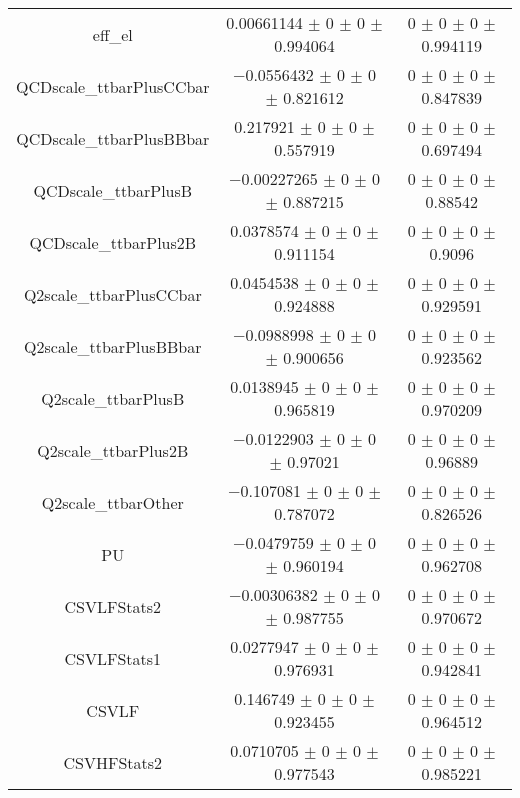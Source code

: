 \begin{table}
\begin{tabular}{ccc}
eff\_el & \num{0.00661144} $\pm$ \num{0} $\pm$ \num{0} $\pm$ \num{0.994064} & \num{0} $\pm$ \num{0} $\pm$ \num{0} $\pm$ \num{0.994119}\\
QCDscale\_ttbarPlusCCbar & \num{-0.0556432} $\pm$ \num{0} $\pm$ \num{0} $\pm$ \num{0.821612} & \num{0} $\pm$ \num{0} $\pm$ \num{0} $\pm$ \num{0.847839}\\
QCDscale\_ttbarPlusBBbar & \num{0.217921} $\pm$ \num{0} $\pm$ \num{0} $\pm$ \num{0.557919} & \num{0} $\pm$ \num{0} $\pm$ \num{0} $\pm$ \num{0.697494}\\
QCDscale\_ttbarPlusB & \num{-0.00227265} $\pm$ \num{0} $\pm$ \num{0} $\pm$ \num{0.887215} & \num{0} $\pm$ \num{0} $\pm$ \num{0} $\pm$ \num{0.88542}\\
QCDscale\_ttbarPlus2B & \num{0.0378574} $\pm$ \num{0} $\pm$ \num{0} $\pm$ \num{0.911154} & \num{0} $\pm$ \num{0} $\pm$ \num{0} $\pm$ \num{0.9096}\\
Q2scale\_ttbarPlusCCbar & \num{0.0454538} $\pm$ \num{0} $\pm$ \num{0} $\pm$ \num{0.924888} & \num{0} $\pm$ \num{0} $\pm$ \num{0} $\pm$ \num{0.929591}\\
Q2scale\_ttbarPlusBBbar & \num{-0.0988998} $\pm$ \num{0} $\pm$ \num{0} $\pm$ \num{0.900656} & \num{0} $\pm$ \num{0} $\pm$ \num{0} $\pm$ \num{0.923562}\\
Q2scale\_ttbarPlusB & \num{0.0138945} $\pm$ \num{0} $\pm$ \num{0} $\pm$ \num{0.965819} & \num{0} $\pm$ \num{0} $\pm$ \num{0} $\pm$ \num{0.970209}\\
Q2scale\_ttbarPlus2B & \num{-0.0122903} $\pm$ \num{0} $\pm$ \num{0} $\pm$ \num{0.97021} & \num{0} $\pm$ \num{0} $\pm$ \num{0} $\pm$ \num{0.96889}\\
Q2scale\_ttbarOther & \num{-0.107081} $\pm$ \num{0} $\pm$ \num{0} $\pm$ \num{0.787072} & \num{0} $\pm$ \num{0} $\pm$ \num{0} $\pm$ \num{0.826526}\\
PU & \num{-0.0479759} $\pm$ \num{0} $\pm$ \num{0} $\pm$ \num{0.960194} & \num{0} $\pm$ \num{0} $\pm$ \num{0} $\pm$ \num{0.962708}\\
CSVLFStats2 & \num{-0.00306382} $\pm$ \num{0} $\pm$ \num{0} $\pm$ \num{0.987755} & \num{0} $\pm$ \num{0} $\pm$ \num{0} $\pm$ \num{0.970672}\\
CSVLFStats1 & \num{0.0277947} $\pm$ \num{0} $\pm$ \num{0} $\pm$ \num{0.976931} & \num{0} $\pm$ \num{0} $\pm$ \num{0} $\pm$ \num{0.942841}\\
CSVLF & \num{0.146749} $\pm$ \num{0} $\pm$ \num{0} $\pm$ \num{0.923455} & \num{0} $\pm$ \num{0} $\pm$ \num{0} $\pm$ \num{0.964512}\\
CSVHFStats2 & \num{0.0710705} $\pm$ \num{0} $\pm$ \num{0} $\pm$ \num{0.977543} & \num{0} $\pm$ \num{0} $\pm$ \num{0} $\pm$ \num{0.985221}\\

\end{tabular}
\end{table}
